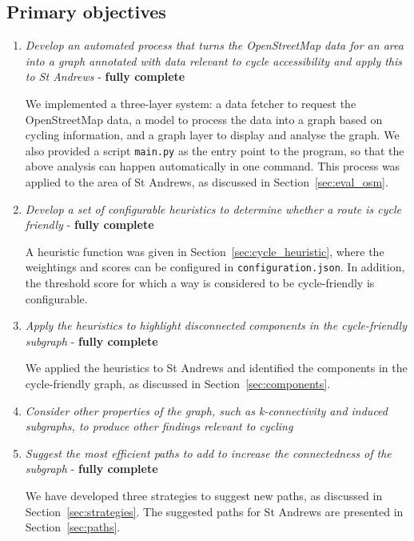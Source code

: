 \documentclass[12pt,a4paper]{report}
\begin{document}
\subsection{Primary objectives}
\begin{enumerate}
    \item \textit{Develop an automated process that turns the OpenStreetMap data for an area into a graph annotated with data relevant to cycle accessibility and apply this to St Andrews} - \textbf{fully complete}

    We implemented a three-layer system: a data fetcher to request the OpenStreetMap data, a model to process the data into a graph based on cycling information, and a graph layer to display and analyse the graph. We also provided a script \texttt{main.py} as the entry point to the program, so that the above analysis can happen automatically in one command. This process was applied to the area of St Andrews, as discussed in Section~\ref{sec:eval_osm}.

    \item \textit{Develop a set of configurable heuristics to determine whether a route is cycle friendly} - \textbf{fully complete}

    A heuristic function was given in Section~\ref{sec:cycle_heuristic}, where the weightings and scores can be configured in \texttt{configuration.json}. In addition, the threshold score for which a way is considered to be cycle-friendly is configurable.

    \item \textit{Apply the heuristics to highlight disconnected components in the cycle-friendly subgraph} - \textbf{fully complete}
    
    We applied the heuristics to St Andrews and identified the components in the cycle-friendly graph, as discussed in Section~\ref{sec:components}.

    \item \textit{Consider other properties of the graph, such as k-connectivity and induced subgraphs, to produce other findings relevant to cycling}

    \item \textit{Suggest the most efficient paths to add to increase the connectedness of the subgraph} - \textbf{fully complete}

    We have developed three strategies to suggest new paths, as discussed in Section~\ref{sec:strategies}. The suggested paths for St Andrews are presented in Section~\ref{sec:paths}.
\end{enumerate}
\end{document}
